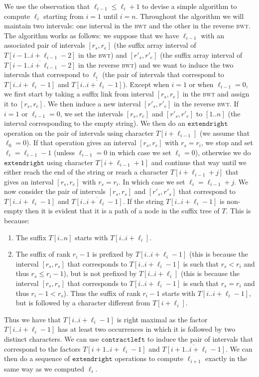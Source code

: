 \documentclass[a4paper]{article}
\begin{document}
We use the observation that $\ell_{i-1}\leq \ell_i+1$ to devise a simple algorithm to compute $\ell_i$ starting from $i=1$ until $i=n$. 
Throughout the algorithm we will maintain two intervals: one interval in the \textsc{bwt} and the other in the reverse \textsc{bwt}. 
The algorithm works as follows: we suppose that we have $\ell_{i-1}$ with an associated pair of intervals $[r_s,r_e]$ (the suffix array interval of $T[i-1..i+\ell_{i-1}-2]$ in the \textsc{bwt}) and $[r'_s,r'_e]$ (the suffix array interval of $\overline{T[i-1..i+\ell_{i-1}-2]}$ in the reverse \textsc{bwt}) and we want to induce the two intervals that correspond to $\ell_i$ (the pair of intervals that correspond to $T[i..i+\ell_{i}-1]$ and $\overline{T[i..i+\ell_{i}-1]}$). Except when $i=1$ or when $\ell_{i-1}=0$, we first start by taking a suffix link from interval $[r_s,r_e]$ in the \textsc{bwt} and assign it to $[r_s,r_e]$. We then induce a new interval $[r'_s,r'_e]$ in the reverse \textsc{bwt}. If $i=1$ or $\ell_{i-1}=0$, we set the intervals $[r_s,r_e]$ and $[r'_s,r'_e]$  to $[1..n]$ (the interval corresponding to the empty string). 
We then do an $\mathtt{extendright}$ operation on the pair of intervals using character $T[i+\ell_{i-1}]$ (we assume that $\ell_0=0$). If that operation gives an interval $[r_s,r_e]$ with $r_s=r_i$, we stop and set $\ell_i=\ell_{i-1}-1$ (unless $\ell_{i-1}=0$ in which case we set $\ell_i=0$), otherwise we do $\mathtt{extendright}$ using character $T[i+\ell_{i-1}+1]$ and continue that way until we either reach the end of the string or reach a character $T[i+\ell_{i-1}+j]$ that gives an interval $[r_s,r_e]$ with $r_s=r_i$. In which case we set $\ell_i=\ell_{i-1}+j$. We now consider the pair of intervals $[r_s,r_s]$ and $[r'_s,r'_s]$ that correspond to $T[i..i+\ell_i-1]$ and $\overline{T[i..i+\ell_i-1]}$. If the string $T[i..i+\ell_i-1]$ is non-empty then it is evident that it is a path of a node in the suffix tree of $T$. This is because:
\begin{enumerate}
\item The suffix $T[i..n]$ starts with $T[i..i+\ell_i]$. 
\item The suffix of rank $r_i-1$ is prefixed by $T[i..i+\ell_i-1]$ (this is because the interval $[r_s,r_s]$ that corresponds to $T[i..i+\ell_i-1]$ is such that $r_s<r_i$ and thus $r_s\leq r_i-1$), but is not prefixed  
by $T[i..i+\ell_i]$ (this is because the interval $[r_s,r_s]$ that corresponds to $T[i..i+\ell_i-1]$ is such that $r_s=r_i$ and thus $r_i-1<r_s$). Thus the suffix of rank $r_i-1$ starts with $T[i..i+\ell_i-1]$, but is followed by a character different from $T[i+\ell_i]$. 
\end{enumerate}
Thus we have that $T[i..i+\ell_i-1]$ is right maximal as the factor $T[i..i+\ell_i-1]$ has at least two occurrences in which it is followed by two distinct characters. We can use $\mathtt{contractleft}$ to induce the pair of intervals that correspond 
to the factors $T[i+1..i+\ell_i-1]$ and $\overline{T[i+1..i+\ell_i-1]}$. We can then do a sequence of $\mathtt{extendright}$ operations to compute $\ell_{i+1}$ 
exactly in the same way as we computed $\ell_i$. 
\end{document}
